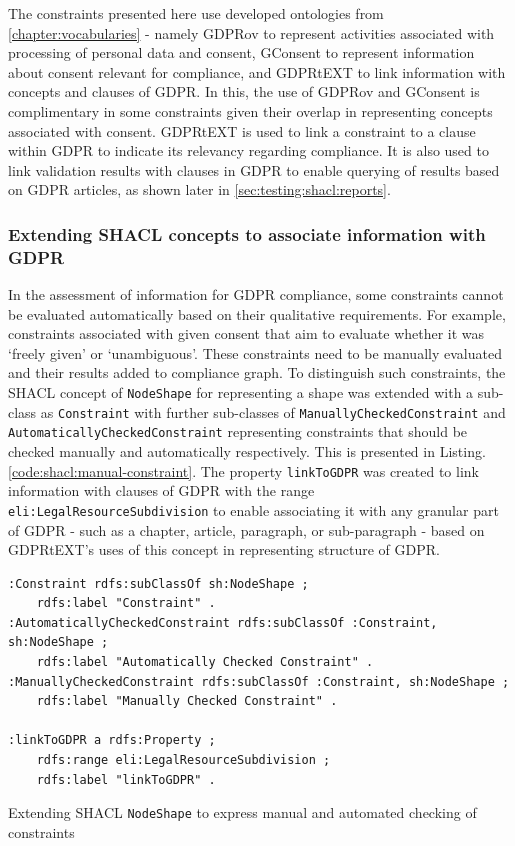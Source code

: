 The constraints presented here use developed ontologies from \autoref{chapter:vocabularies} - namely GDPRov to represent activities associated with processing of personal data and consent, GConsent to represent information about consent relevant for compliance, and GDPRtEXT to link information with concepts and clauses of GDPR.
In this, the use of GDPRov and GConsent is complimentary in some constraints given their overlap in representing concepts associated with consent.
GDPRtEXT is used to link a constraint to a clause within GDPR to indicate its relevancy regarding compliance. It is also used to link validation results with clauses in GDPR to enable querying of results based on GDPR articles, as shown later in \autoref{sec:testing:shacl:reports}.

\subsubsection{Extending SHACL concepts to associate information with GDPR}
In the assessment of information for GDPR compliance, some constraints cannot be evaluated automatically based on their qualitative requirements. For example, constraints associated with given consent that aim to evaluate whether it was `freely given' or `unambiguous'. These constraints need to be manually evaluated and their results added to compliance graph.
To distinguish such constraints, the SHACL concept of \texttt{NodeShape} for representing a shape was extended with a sub-class as \texttt{Constraint} with further sub-classes of \texttt{ManuallyCheckedConstraint} and \texttt{AutomaticallyCheckedConstraint} representing constraints that should be checked manually and automatically respectively. This is presented in Listing.\autoref{code:shacl:manual-constraint}.
The property \texttt{linkToGDPR} was created to link information with clauses of GDPR with the range \texttt{eli:LegalResourceSubdivision} to enable associating it with any granular part of GDPR - such as a chapter, article, paragraph, or sub-paragraph - based on GDPRtEXT's uses of this concept in representing structure of GDPR.
\begin{listing}[htbp]
\begin{verbatim}
:Constraint rdfs:subClassOf sh:NodeShape ;
    rdfs:label "Constraint" .
:AutomaticallyCheckedConstraint rdfs:subClassOf :Constraint, sh:NodeShape ;
    rdfs:label "Automatically Checked Constraint" .
:ManuallyCheckedConstraint rdfs:subClassOf :Constraint, sh:NodeShape ;
    rdfs:label "Manually Checked Constraint" .
    
:linkToGDPR a rdfs:Property ;
    rdfs:range eli:LegalResourceSubdivision ;
    rdfs:label "linkToGDPR" .
\end{verbatim}
\caption{Extending SHACL \texttt{NodeShape} to express manual and automated checking of constraints}
\label{code:shacl:manual-constraint}
\end{listing}

